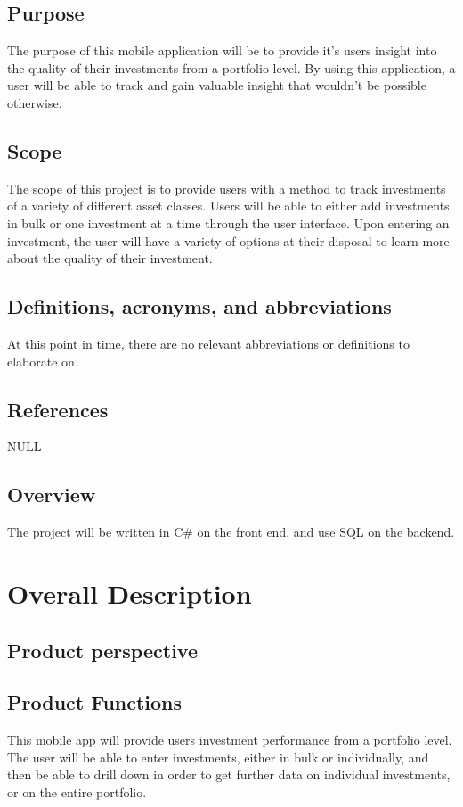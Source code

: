 \documentclass[onecolumn, draftclsnofoot,10pt, compsoc]{IEEEtran}
\begin{document}
\subsection{Purpose}
The purpose of this mobile application will be to provide it's users insight into the quality of their investments from a portfolio level. By using this application, a user will be able to track and gain valuable insight that wouldn't be possible otherwise.

\subsection{Scope}
The scope of this project is to provide users with a method to track investments of a variety of different asset classes. Users will be able to either add investments in bulk or one investment at a time through the user interface. Upon entering an investment, the user will have a variety of options at their disposal to learn more about the quality of their investment.

\subsection{Definitions, acronyms, and abbreviations}
At this point in time, there are no relevant abbreviations or definitions to elaborate on.

\subsection{References}
NULL

\subsection{Overview}
The project will be written in C\# on the front end, and use SQL on the backend. 


\section{Overall Description}

\subsection{Product perspective}

\subsection{Product Functions}
This mobile app will provide users investment performance from a portfolio level. The user will be able to enter investments, either in bulk or individually, and then be able to drill down in order to get further data on individual investments, or on the entire portfolio.
\end{document}

